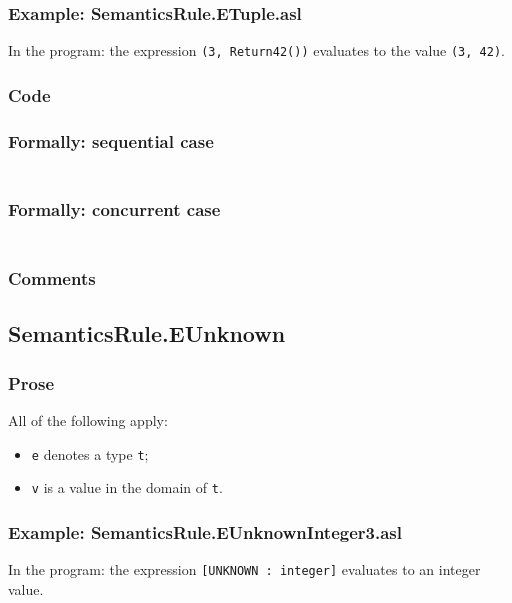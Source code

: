 \documentclass{book}
\begin{document}
  \subsubsection{Example: SemanticsRule.ETuple.asl}
    In the program:
    the expression \texttt{(3, Return42())} evaluates to the value \texttt{(3, 42)}.

  \subsubsection{Code}

  \subsubsection{Formally: sequential case}
  \begin{align}
  \end{align} 

  \subsubsection{Formally: concurrent case}
  \begin{align}
  \end{align} 

  \subsubsection{Comments}

\subsection{SemanticsRule.EUnknown \label{sec:SemanticsRule.EUnknown}}

  \subsubsection{Prose}
  All of the following apply:
  \begin{itemize}
  \item \texttt{e} denotes a type \texttt{t};
  \item \texttt{v} is a value in the domain of \texttt{t}.
  \end{itemize}

  \subsubsection{Example: SemanticsRule.EUnknownInteger3.asl}
    In the program:
    the expression \texttt{[UNKNOWN : integer]} evaluates to an integer value.
\end{document}
